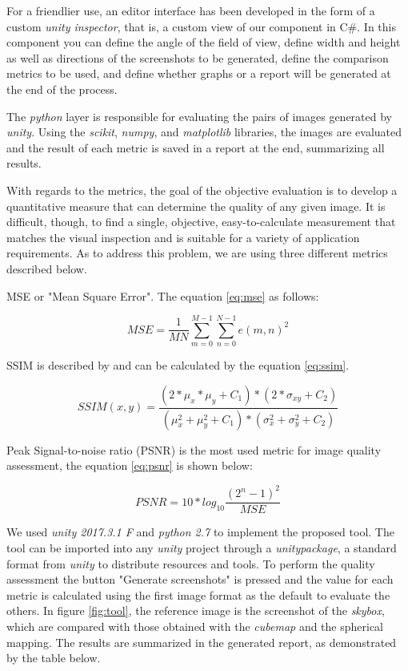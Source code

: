 \documentclass[12pt]{article}
\begin{document}
For a friendlier use, an editor interface has been developed in the form of a custom \textit{unity inspector}, that is, a custom view of our component in C\#. In this component you can define the angle of the field of view, define width and height as well as directions of the screenshots to be generated, define the comparison metrics to be used, and define whether graphs or a report will be generated at the end of the process.

The \textit{python} layer is responsible for evaluating the pairs of images generated by \textit{unity}. Using the \textit{scikit}, \textit{numpy}, and \textit{matplotlib} libraries, the images are evaluated and the result of each metric is saved in a report at the end, summarizing all results. 

With regards to the metrics, the goal of the objective evaluation is to develop a quantitative measure that can determine the quality of any given image. It is difficult, though, to find a single, objective, easy-to-calculate measurement that matches the visual inspection and is suitable for a variety of application requirements. As to address this problem, we are using three different metrics described below.

MSE or "Mean Square Error". The equation \ref{eq:mse} as follows:

\begin{equation}
MSE=\frac{1}{MN}\sum_{m=0}^{M-1}{\sum_{n=0}^{N-1}{e(m,n)^2}}
\label{eq:mse}
\end{equation}

SSIM is described by \cite{wang2004image} and can be calculated by the equation \ref{eq:ssim}.

\begin{equation}
SSIM(x,y)=\frac{(2*\mu_x*\mu_y+C_1)*(2*\sigma_{xy}+C_2)}{(\mu^2_x+\mu^2_y+C_1)*(\sigma^2_x+\sigma^2_y+C_2)}
\label{eq:ssim}
\end{equation}

Peak Signal-to-noise ratio (PSNR) is the most used metric for image quality assessment, the equation \ref{eq:psnr} is shown below:

\begin{equation}
PSNR = 10*log_{10}{\frac{(2^n-1)^2}{MSE}}
\label{eq:psnr}
\end{equation}

We used \textit{unity 2017.3.1 F} and \textit{python 2.7} to implement the proposed tool. The tool can be imported into any \textit{unity} project through a \textit{unitypackage}, a standard format from \textit{unity} to distribute resources and tools. To perform the quality assessment the button "Generate screenshots" is pressed and the value for each metric is calculated using the first image format as the default to evaluate the others. In figure \ref{fig:tool}, the reference image is the screenshot of the \textit{skybox}, which are compared with those obtained with the \textit{cubemap} and the spherical mapping. The results are summarized in the generated report, as demonstrated by the table below.
\end{document}
